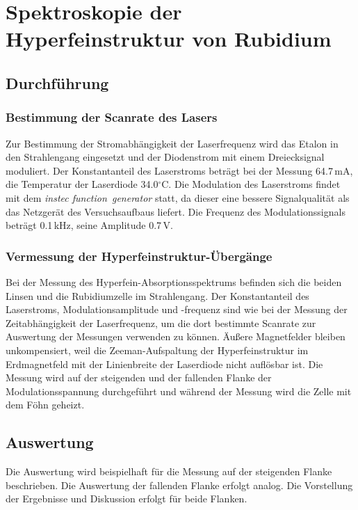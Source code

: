 \section{Spektroskopie der Hyperfeinstruktur von Rubidium}
\subsection{Durchführung}
\subsubsection*{Bestimmung der Scanrate des Lasers}
Zur Bestimmung der Stromabhängigkeit der
Laserfrequenz wird das Etalon in den Strahlengang eingesetzt und der Diodenstrom mit einem Dreiecksignal moduliert.
Der Konstantanteil des Laserstroms beträgt bei der Messung 64.7\,mA,
die Temperatur der Laserdiode 34.0$^\circ$C.
Die Modulation des Laserstroms findet mit dem \emph{instec function~generator} statt,
da dieser eine bessere Signalqualität als das Netzgerät des Versuchsaufbaus liefert.
Die Frequenz des Modulationssignals beträgt 0.1\,kHz, seine Amplitude 0.7\,V.

\subsubsection*{Vermessung der Hyperfeinstruktur-Übergänge}
Bei der Messung des Hyperfein-Absorptionsspektrums befinden sich die beiden Linsen und
die Rubidiumzelle im Strahlengang.
Der Konstantanteil des Laserstroms, Modulationsamplitude und -frequenz
sind wie bei der Messung der Zeitabhängigkeit der Laserfrequenz, um die dort bestimmte Scanrate
zur Auswertung der Messungen verwenden zu können.
Äußere Magnetfelder bleiben unkompensiert, weil die Zeeman-Aufspaltung der Hyperfeinstruktur im Erdmagnetfeld
mit der Linienbreite der Laserdiode nicht auflösbar ist.
Die Messung wird auf der steigenden und der fallenden Flanke der Modulationsspannung durchgeführt und
während der Messung wird die Zelle mit dem Föhn geheizt.

\subsection{Auswertung}
Die Auswertung wird beispielhaft für die Messung auf der steigenden Flanke beschrieben. Die Auswertung der fallenden Flanke erfolgt analog. 
Die Vorstellung der Ergebnisse und Diskussion erfolgt für beide Flanken.
